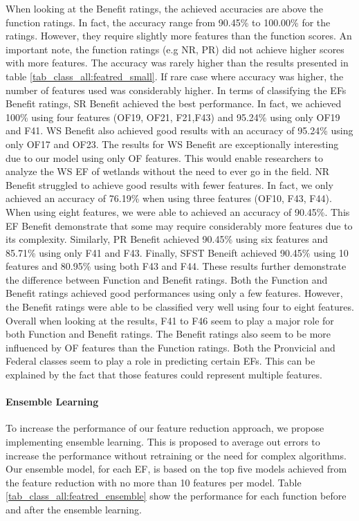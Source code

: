 \documentclass[12pt,letterpaper]{article}
\begin{document}
When looking at the Benefit ratings, the achieved accuracies are above the function ratings.
In fact, the accuracy range from 90.45\% to 100.00\% for the ratings.
However, they require slightly more features than the function scores.
An important note, the function ratings (e.g \ac{NR}, \ac{PR}) did not achieve higher scores with more features.
The accuracy was rarely higher than the results presented in table \ref{tab_class_all:featred_small}.
If rare case where accuracy was higher, the number of features used was considerably higher.
In terms of classifying the \ac{EF}s Benefit ratings, \ac{SR} Benefit achieved the best performance.
In fact, we achieved 100\% using four features (OF19, OF21, F21,F43) and 95.24\% using only OF19 and F41.
\ac{WS} Benefit also achieved good results with an accuracy of 95.24\% using only OF17 and OF23.
The results for \ac{WS} Benefit are exceptionally interesting due to our model using only OF features.
This would enable researchers to analyze the \ac{WS} \ac{EF} of wetlands without the need to ever go in the field.
\ac{NR} Benefit struggled to achieve good results with fewer features.
In fact, we only achieved an accuracy of 76.19\% when using three features (OF10, F43, F44).
When using eight features, we were able to achieved an accuracy of 90.45\%.
This \ac{EF} Benefit demonstrate that some may require considerably more features due to its complexity.
Similarly, \ac{PR} Benefit achieved 90.45\% using six features and 85.71\% using only F41 and F43.
Finally, \ac{SFST} Beneift achieved 90.45\% using 10 features and 80.95\% using both F43 and F44.
These results further demonstrate the difference between Function and Benefit ratings.
Both the Function and Benefit ratings achieved good performances using only a few features.
However, the Benefit ratings were able to be classified very well using four to eight features.
Overall when looking at the results, F41 to F46 seem to play a major role for both Function and Benefit ratings.
The Benefit ratings also seem to be more influenced by OF features than the Function ratings.
Both the Pronvicial and Federal classes seem to play a role in predicting certain \ac{EF}s.
This can be explained by the fact that those features could represent multiple features.


\paragraph{Ensemble Learning}
To increase the performance of our feature reduction approach, we propose implementing ensemble learning.
This is proposed to average out errors to increase the performance without retraining or the need for complex algorithms.
Our ensemble model, for each \ac{EF}, is based on the top five models achieved from the feature reduction with no more than 10 features per model.
Table \ref{tab_class_all:featred_ensemble} show the performance for each function before and after the ensemble learning.

\end{document}
